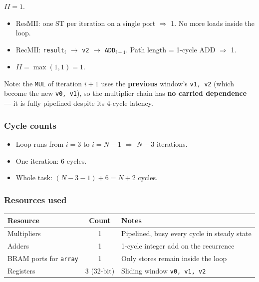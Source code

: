 \documentclass[11pt,a4paper]{article}
\begin{document}
$II = 1$.

\begin{itemize}[noitemsep]
  \item $\mathrm{ResMII}$: one ST per iteration on a single port $\Rightarrow$ 1. No more loads inside the loop.
  \item $\mathrm{RecMII}$: \texttt{result$_i$} $\to$ \texttt{v2} $\to$ \texttt{ADD$_{i+1}$}. Path length = 1-cycle ADD $\Rightarrow$ 1.
  \item $II = \max(1, 1) = 1$.
\end{itemize}

Note: the \texttt{MUL} of iteration $i+1$ uses the \textbf{previous} window's \texttt{v1, v2} (which become the new \texttt{v0, v1}), so the multiplier chain has \textbf{no carried dependence} --- it is fully pipelined despite its 4-cycle latency.

\subsubsection*{Cycle counts}

\begin{itemize}[noitemsep]
  \item Loop runs from $i = 3$ to $i = N-1$ $\Rightarrow$ $N - 3$ iterations.
  \item One iteration: 6 cycles.
  \item Whole task: $(N - 3 - 1) + 6 = N + 2$ cycles.
\end{itemize}

\subsubsection*{Resources used}

\begin{center}
\begin{tabular}{lcl}
\toprule
Resource & Count & Notes \\
\midrule
Multipliers              & 1 & Pipelined, busy every cycle in steady state \\
Adders                   & 1 & 1-cycle integer add on the recurrence \\
BRAM ports for \texttt{array} & 1 & Only stores remain inside the loop \\
Registers                & 3 (32-bit) & Sliding window \texttt{v0, v1, v2} \\
\bottomrule
\end{tabular}
\end{center}
\end{document}
